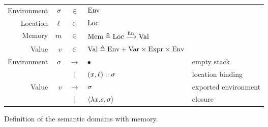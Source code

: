 \documentclass{article}
\begin{document}
\begin{figure}[h!]
  \centering
  \begin{tabular}{rrcll}
    Environment & $\sigma$ & $\in$         & $\text{Env}$                                                                       \\
    Location    & $\ell$ & $\in$         & $\text{Loc}$                                                                       \\
    Memory      & $m$ & $\in$         & $\text{Mem}\triangleq{\text{Loc}}\xrightarrow{\text{fin}}{\text{Val}}$                                           \\
    Value       & $v$    & $\in$         & $\text{Val} \triangleq\text{Env}+\text{Var}\times\text{Expr}\times\text{Env}$                        \\
    Environment & $\sigma$ & $\rightarrow$ & $\bullet$                                             & empty stack          \\
                &        & $|$       & $(x,\ell)::\sigma$                                   & location binding     \\
    Value       & $v$    & $\rightarrow$ & $\sigma$                                                & exported environment \\
                &        & $|$       & $\langle \lambda x.e, \sigma \rangle$                   & closure
  \end{tabular}
  \caption{Definition of the semantic domains with memory.}
  \label{fig:memdomain}
\end{figure}
\end{document}
